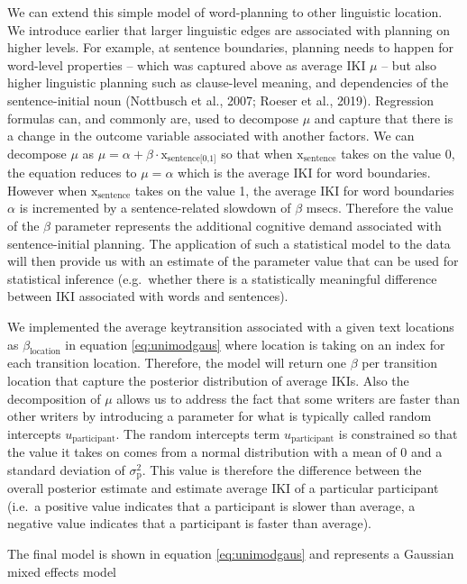 \documentclass[
  man,floatsintext]{apa7}
\begin{document}
We can extend this simple model of word-planning to other linguistic location. We introduce earlier that larger linguistic edges are associated with planning on higher levels. For example, at sentence boundaries, planning needs to happen for word-level properties -- which was captured above as average IKI \(\mu\) -- but also higher linguistic planning such as clause-level meaning, and dependencies of the sentence-initial noun (Nottbusch et al., 2007; Roeser et al., 2019). Regression formulas can, and commonly are, used to decompose \(\mu\) and capture that there is a change in the outcome variable associated with another factors. We can decompose \(\mu\) as \(\mu = \alpha + \beta \cdot \text{x}_\text{sentence[0,1]}\) so that when \(\text{x}_\text{sentence}\) takes on the value 0, the equation reduces to \(\mu = \alpha\) which is the average IKI for word boundaries. However when \(\text{x}_\text{sentence}\) takes on the value 1, the average IKI for word boundaries \(\alpha\) is incremented by a sentence-related slowdown of \(\beta\) msecs. Therefore the value of the \(\beta\) parameter represents the additional cognitive demand associated with sentence-initial planning. The application of such a statistical model to the data will then provide us with an estimate of the parameter value that can be used for statistical inference (e.g.~whether there is a statistically meaningful difference between IKI associated with words and sentences).

We implemented the average keytransition associated with a given text locations as \(\beta_\text{location}\) in equation \ref{eq:unimodgaus} where \(\text{location}\) is taking on an index for each transition location. Therefore, the model will return one \(\beta\) per transition location that capture the posterior distribution of average IKIs. Also the decomposition of \(\mu\) allows us to address the fact that some writers are faster than other writers by introducing a parameter for what is typically called random intercepts \(u_\text{participant}\). The random intercepts term \(u_\text{participant}\) is constrained so that the value it takes on comes from a normal distribution with a mean of 0 and a standard deviation of \(\sigma_\text{p}^2\). This value is therefore the difference between the overall posterior estimate and estimate average IKI of a particular participant (i.e.~a positive value indicates that a participant is slower than average, a negative value indicates that a participant is faster than average).

The final model is shown in equation \ref{eq:unimodgaus} and represents a Gaussian mixed effects model
\end{document}
